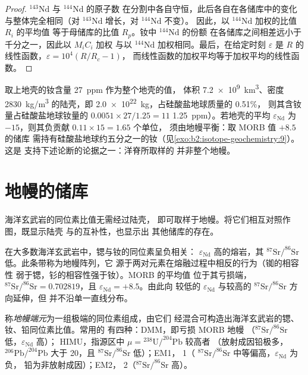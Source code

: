 \begin{proof}
$^{143}\mathrm{Nd}$ 与 $^{144}\mathrm{Nd}$ 的原子数
在分割中各自守恒，此后各自在各储库中的变化
与整体完全相同（对 $^{143}\mathrm{Nd}$ 增长，对 $^{144}\mathrm{Nd}$ 不变）。
因此，以 $^{144}\mathrm{Nd}$ 加权的比值 $R_i$ 的平均值
等于母储库的比值 $R_p$。钕中 $^{144}\mathrm{Nd}$ 的份额
在各储库之间相差远小于千分之一，因此以 $M_iC_i$ 加权
与以 $^{144}\mathrm{Nd}$ 加权相同。最后，在给定时刻
$\varepsilon$ 是 $R$ 的线性函数，$\varepsilon = 10^4(R/R_c - 1)$，
而线性函数的加权平均等于加权平均的线性函数。
\end{proof}

取上地壳的钕含量 \qty{27}{ppm} 作为整个地壳的值，
体积 \qty{7.2e9}{km^3}、密度 \qty{2830}{kg/m^3} 的陆壳，即
\qty{2.0e22}{kg}，占硅酸盐地球质量的 0.51\%，
则其含钕量占硅酸盐地球钕量的 $0.0051\times27/1.25 = 11$%
\qty{1.25}{ppm}）。若地壳的平均 $\varepsilon_{\mathrm{Nd}}$ 为
$-15$，则其负贡献 $0.11\times15 = 1.65$ 个单位，
须由地幔平衡：取 MORB 值 $+8.5$ 的储库
需持有硅酸盐地球约五分之一的钕（见\cref{exo:b2:isotope-geochemistry:9}）。这是
支持下述论断的论据之一：洋脊所取样的
并非整个地幔。

\section{地幔的储库}

海洋玄武岩的同位素比值无需经过陆壳，
即可取样于地幔。将它们相互对照作图，既显示陆壳
与的互补性，也显示出
其他储库的存在。

在大多数海洋玄武岩中，锶与钕的同位素呈负相关：
$\varepsilon_{\mathrm{Nd}}$ 高的熔岩，其
$^{87}\mathrm{Sr}/^{86}\mathrm{Sr}$ 低。此条带称为地幔阵列，它
源于两对元素在熔融过程中相反的行为（铷的相容性
弱于锶，钐的相容性强于钕）。MORB 的平均值
位于其亏损端，$^{87}\mathrm{Sr}/^{86}\mathrm{Sr} = 0.702819$，且
$\varepsilon_{\mathrm{Nd}} = +8.5$。由此向
较低的 $\varepsilon_{\mathrm{Nd}}$ 与较高的 $^{87}\mathrm{Sr}/^{86}\mathrm{Sr}$ 方向延伸，但
并不沿单一直线分布。

\begin{definition}[地幔端元]\label{def:b2:isotope-geochemistry:end-members}
称\emph{地幔端元}为一组极端的同位素组成，由它们
经混合可构造出海洋玄武岩的锶、钕、铅同位素比值。常用的
有四种：DMM，即亏损 MORB 地幔
（$^{87}\mathrm{Sr}/^{86}\mathrm{Sr}$ 低，$\varepsilon_{\mathrm{Nd}}$ 高）；
HIMU，指源区中 $\mu = {}^{238}\mathrm{U}/^{204}\mathrm{Pb}$ 较高者
（放射成因铅极多，$^{206}\mathrm{Pb}/^{204}\mathrm{Pb}$ 大于 20，且
$^{87}\mathrm{Sr}/^{86}\mathrm{Sr}$ 低）；EM1， 1（
$^{87}\mathrm{Sr}/^{86}\mathrm{Sr}$ 中等偏高，$\varepsilon_{\mathrm{Nd}}$ 为负，
铅为非放射成因）；EM2， 2（$^{87}\mathrm{Sr}/^{86}\mathrm{Sr}$ 高）。
\end{definition}


